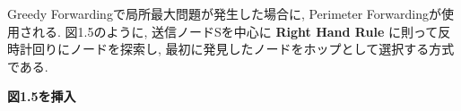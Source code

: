 Greedy Forwardingで局所最大問題が発生した場合に, 
Perimeter Forwardingが使用される. 
図1.5のように, 送信ノードSを中心に
\textbf{Right Hand Rule} に則って反時計回りにノードを探索し, 
最初に発見したノードをホップとして選択する方式である.

\textbf{図1.5を挿入}